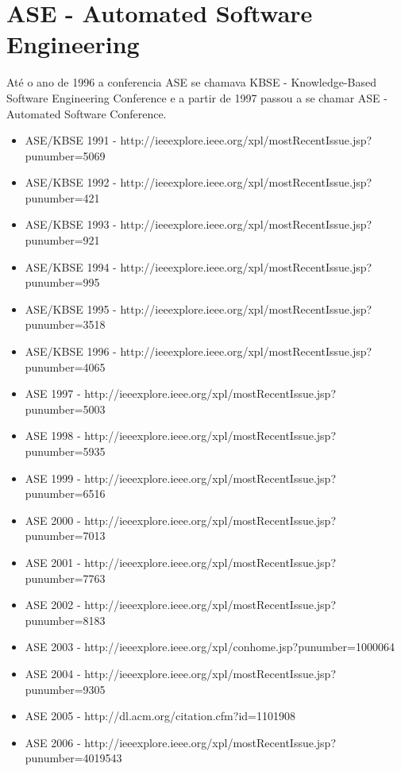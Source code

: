 \section{ASE - Automated Software Engineering}

Até o ano de 1996 a conferencia ASE se chamava KBSE - Knowledge-Based Software
Engineering Conference e a partir de 1997 passou a se chamar ASE - Automated
Software Conference.

\begin{itemize}
  \item ASE/KBSE 1991 - {\small http://ieeexplore.ieee.org/xpl/mostRecentIssue.jsp?punumber=5069}
  \item ASE/KBSE 1992 - {\small http://ieeexplore.ieee.org/xpl/mostRecentIssue.jsp?punumber=421}
  \item ASE/KBSE 1993 - {\small http://ieeexplore.ieee.org/xpl/mostRecentIssue.jsp?punumber=921}
  \item ASE/KBSE 1994 - {\small http://ieeexplore.ieee.org/xpl/mostRecentIssue.jsp?punumber=995}
  \item ASE/KBSE 1995 - {\small http://ieeexplore.ieee.org/xpl/mostRecentIssue.jsp?punumber=3518}
  \item ASE/KBSE 1996 - {\small http://ieeexplore.ieee.org/xpl/mostRecentIssue.jsp?punumber=4065}
  \item ASE 1997 - {\small http://ieeexplore.ieee.org/xpl/mostRecentIssue.jsp?punumber=5003}
  \item ASE 1998 - {\small http://ieeexplore.ieee.org/xpl/mostRecentIssue.jsp?punumber=5935}
  \item ASE 1999 - {\small http://ieeexplore.ieee.org/xpl/mostRecentIssue.jsp?punumber=6516}
  \item ASE 2000 - {\small http://ieeexplore.ieee.org/xpl/mostRecentIssue.jsp?punumber=7013}
  \item ASE 2001 - {\small http://ieeexplore.ieee.org/xpl/mostRecentIssue.jsp?punumber=7763}
  \item ASE 2002 - {\small http://ieeexplore.ieee.org/xpl/mostRecentIssue.jsp?punumber=8183}
  \item ASE 2003 - {\small http://ieeexplore.ieee.org/xpl/conhome.jsp?punumber=1000064}
  \item ASE 2004 - {\small http://ieeexplore.ieee.org/xpl/mostRecentIssue.jsp?punumber=9305}
  \item ASE 2005 - {\small http://dl.acm.org/citation.cfm?id=1101908}
  \item ASE 2006 - {\small http://ieeexplore.ieee.org/xpl/mostRecentIssue.jsp?punumber=4019543}

\end{itemize}
